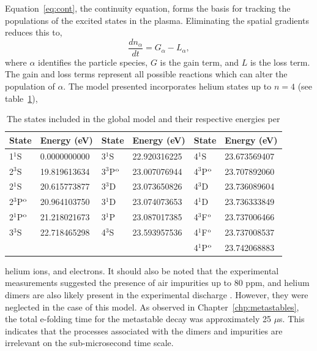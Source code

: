 Equation~\ref{eq:cont}, the continuity equation, forms the basis for tracking
the populations of the excited states in the plasma. Eliminating the spatial
gradients reduces this to,
\begin{equation}
  \frac{d n_\alpha}{dt} = G_\alpha - L_\alpha,
  \label{eq:zdmcont}
\end{equation}
where $\alpha$ identifies the particle species, $G$ is the gain term, and $L$ is
the loss term. The gain and loss terms represent all possible reactions which
can alter the population of $\alpha$. The model presented incorporates helium
states up to $n=4$ (see table~\ref{tbl:states}),
\begin{table}
  \centering
  \caption{The states included in the global model and their respective energies
    per \cite{Kramida2012}}
  \label{tbl:states}
  \begin{tabular}{ll|ll|ll}
    \toprule
    State        & Energy (eV)   & State       & Energy (eV)
                                                 & State        & Energy (eV)  \\
    \midrule
    1$^1$S       & 0.0000000000 & 3$^1$S       & 22.920316225  
                                                 & 4$^1$S       & 23.673569407 \\
    2$^3$S       & 19.819613634 & 3$^3$P$^\mathrm{o}$ & 23.007076944
                                                 & 4$^3$P$^\mathrm{o}$ & 23.707892060 \\
    2$^1$S       & 20.615773877 & 3$^3$D       & 23.073650826  
                                                 & 4$^3$D       & 23.736089604 \\
    2$^3$P$^\mathrm{o}$ & 20.964103750 & 3$^1$D       & 23.074073653
                                                 & 4$^1$D       & 23.736333849 \\
    2$^1$P$^\mathrm{o}$ & 21.218021673 & 3$^1$P       & 23.087017385
                                                 & 4$^3$F$^\mathrm{o}$ & 23.737006466 \\
    3$^3$S       & 22.718465298 & 4$^3$S       & 23.593957536
                                                 & 4$^1$F$^\mathrm{o}$ & 23.737008537 \\
                 &              &              &
                                                 & 4$^1$P$^\mathrm{o}$ & 23.742068883 \\

    \bottomrule
  \end{tabular}
\end{table}
helium ions, and electrons. It should also be noted that the experimental
measurements suggested the presence of air impurities up to 80 ppm, and helium
dimers are also likely present in the experimental discharge
\cite{Pouvesle1988}. However, they were neglected in the case of this model. As
observed in Chapter~\ref{chp:metastables}, the total e-folding time for the
metastable decay was approximately 25 $\mu$s. This indicates that the processes
associated with the dimers and impurities are irrelevant on the sub-microsecond
time scale.

